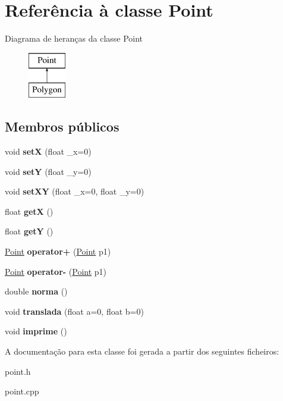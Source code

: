 \hypertarget{class_point}{}\section{Referência à classe Point}
\label{class_point}
Diagrama de heranças da classe Point\begin{figure}[H]
\begin{center}
\leavevmode
\includegraphics[height=2.000000cm]{class_point}
\end{center}
\end{figure}
\subsection*{Membros públicos}
\begin{DoxyCompactItemize}
\item 
\mbox{\label{class_point_a71e14784800fdf014b1dad07042b6b58}} 
void {\bfseries setX} (float \+\_\+x=0)
\item 
\mbox{\label{class_point_a1a662e77ed872c6528baa01ded1cfea6}} 
void {\bfseries setY} (float \+\_\+y=0)
\item 
\mbox{\label{class_point_ab05bb91232ba62143456855b81db5ed0}} 
void {\bfseries set\+XY} (float \+\_\+x=0, float \+\_\+y=0)
\item 
\mbox{\label{class_point_acc27466778cc87a662bba40268c4c0c8}} 
float {\bfseries getX} ()
\item 
\mbox{\label{class_point_a3cccbca94719ddde353cce86ce0e2f64}} 
float {\bfseries getY} ()
\item 
\mbox{\label{class_point_ad73d7e70a1d4ff675c98fdcc29bd3f49}} 
\hyperlink{class_point}{Point} {\bfseries operator+} (\hyperlink{class_point}{Point} p1)
\item 
\mbox{\label{class_point_ab5658ed6bab41aa67a6f62536d782868}} 
\hyperlink{class_point}{Point} {\bfseries operator-\/} (\hyperlink{class_point}{Point} p1)
\item 
\mbox{\label{class_point_a4c302c05a75713df428361264b3eb1b3}} 
double {\bfseries norma} ()
\item 
\mbox{\label{class_point_a69851f251df64023a2661c56c6273e2f}} 
void {\bfseries translada} (float a=0, float b=0)
\item 
\mbox{\label{class_point_a1fb5c2501c27ab2cbc99d06c2a26a741}} 
void {\bfseries imprime} ()
\end{DoxyCompactItemize}


A documentação para esta classe foi gerada a partir dos seguintes ficheiros\+:\begin{DoxyCompactItemize}
\item 
point.\+h\item 
point.\+cpp\end{DoxyCompactItemize}
